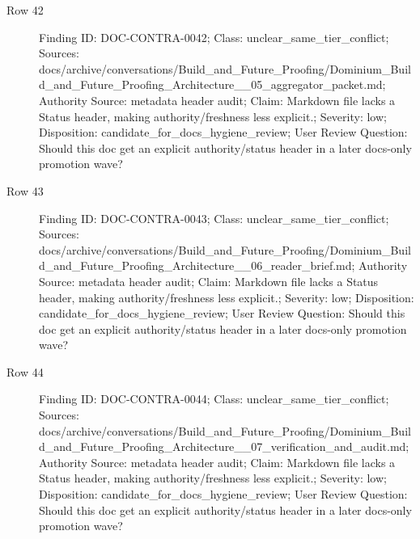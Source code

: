 \documentclass[10.5pt,a4paper,openany]{book}
\begin{document}
\begin{description}
\item[Row 42] Finding ID: DOC-\allowbreak{}CONTRA-\allowbreak{}0042; Class: unclear\_\allowbreak{}same\_\allowbreak{}tier\_\allowbreak{}conflict; Sources: docs/\allowbreak{}archive/\allowbreak{}conversations/\allowbreak{}Build\_\allowbreak{}and\_\allowbreak{}Future\_\allowbreak{}Proofing/\allowbreak{}Dominium\_\allowbreak{}Build\_\allowbreak{}and\_\allowbreak{}Future\_\allowbreak{}Proofing\_\allowbreak{}Architecture\_\allowbreak{}\_\allowbreak{}05\_\allowbreak{}aggregator\_\allowbreak{}packet.\allowbreak{}md; Authority Source: metadata header audit; Claim: Markdown file lacks a Status header, making authority/\allowbreak{}freshness less explicit.\allowbreak{}; Severity: low; Disposition: candidate\_\allowbreak{}for\_\allowbreak{}docs\_\allowbreak{}hygiene\_\allowbreak{}review; User Review Question: Should this doc get an explicit authority/\allowbreak{}status header in a later docs-\allowbreak{}only promotion wave?
\item[Row 43] Finding ID: DOC-\allowbreak{}CONTRA-\allowbreak{}0043; Class: unclear\_\allowbreak{}same\_\allowbreak{}tier\_\allowbreak{}conflict; Sources: docs/\allowbreak{}archive/\allowbreak{}conversations/\allowbreak{}Build\_\allowbreak{}and\_\allowbreak{}Future\_\allowbreak{}Proofing/\allowbreak{}Dominium\_\allowbreak{}Build\_\allowbreak{}and\_\allowbreak{}Future\_\allowbreak{}Proofing\_\allowbreak{}Architecture\_\allowbreak{}\_\allowbreak{}06\_\allowbreak{}reader\_\allowbreak{}brief.\allowbreak{}md; Authority Source: metadata header audit; Claim: Markdown file lacks a Status header, making authority/\allowbreak{}freshness less explicit.\allowbreak{}; Severity: low; Disposition: candidate\_\allowbreak{}for\_\allowbreak{}docs\_\allowbreak{}hygiene\_\allowbreak{}review; User Review Question: Should this doc get an explicit authority/\allowbreak{}status header in a later docs-\allowbreak{}only promotion wave?
\item[Row 44] Finding ID: DOC-\allowbreak{}CONTRA-\allowbreak{}0044; Class: unclear\_\allowbreak{}same\_\allowbreak{}tier\_\allowbreak{}conflict; Sources: docs/\allowbreak{}archive/\allowbreak{}conversations/\allowbreak{}Build\_\allowbreak{}and\_\allowbreak{}Future\_\allowbreak{}Proofing/\allowbreak{}Dominium\_\allowbreak{}Build\_\allowbreak{}and\_\allowbreak{}Future\_\allowbreak{}Proofing\_\allowbreak{}Architecture\_\allowbreak{}\_\allowbreak{}07\_\allowbreak{}verification\_\allowbreak{}and\_\allowbreak{}audit.\allowbreak{}md; Authority Source: metadata header audit; Claim: Markdown file lacks a Status header, making authority/\allowbreak{}freshness less explicit.\allowbreak{}; Severity: low; Disposition: candidate\_\allowbreak{}for\_\allowbreak{}docs\_\allowbreak{}hygiene\_\allowbreak{}review; User Review Question: Should this doc get an explicit authority/\allowbreak{}status header in a later docs-\allowbreak{}only promotion wave?

\end{description}
\end{document}
